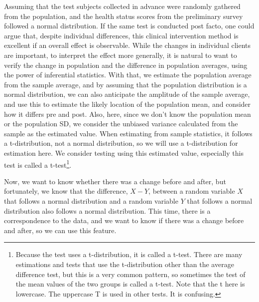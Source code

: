 \documentclass{ltjsbook}
\begin{document}
Assuming that the test subjects collected in advance were randomly gathered from the population, and the health status scores from the preliminary survey followed a normal distribution. If the same test is conducted post facto, one could argue that, despite individual differences, this clinical intervention method is excellent if an overall effect is observable. While the changes in individual clients are important, to interpret the effect more generally, it is natural to want to verify the change in population and the difference in population averages, using the power of inferential statistics. With that, we estimate the population average from the sample average, and by assuming that the population distribution is a normal distribution, we can also anticipate the amplitude of the sample average, and use this to estimate the likely location of the population mean, and consider how it differs pre and post. Also, here, since we don't know the population mean or the population SD, we consider the unbiased variance calculated from the sample as the estimated value. When estimating from sample statistics, it follows a t-distribution, not a normal distribution, so we will use a t-distribution for estimation here. We consider testing using this estimated value, especially this test is called a t-test\footnote{Because the test uses a t-distribution, it is called a t-test. There are many estimations and tests that use the t-distribution other than the average difference test, but this is a very common pattern, so sometimes the test of the mean values of the two groups is called a t-test. Note that the t here is lowercase. The uppercase T is used in other tests. It is confusing.}.


Now, we want to know whether there was a change before and after, but fortunately, we know that the difference, $X-Y$, between a random variable $X$ that follows a normal distribution and a random variable $Y$ that follows a normal distribution also follows a normal distribution. This time, there is a correspondence to the data, and we want to know if there was a change before and after, so we can use this feature.
\end{document}
